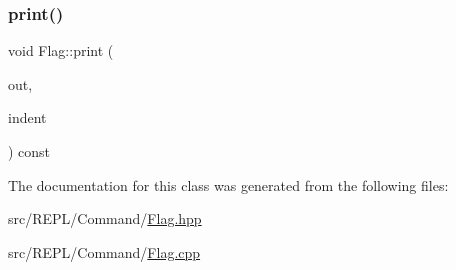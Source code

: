 \mbox{\label{classxd_1_1repl_1_1cmd_1_1_flag_a4ae9f01469a079faa39701b5be927353}} 
\subsubsection{\texorpdfstring{print()}{print()}}
{\footnotesize\ttfamily void Flag\+::print (\begin{DoxyParamCaption}\item[{std\+::ostream \&}]{out,  }\item[{\mbox{\hyperlink{classxd_1_1util_1_1_indent_helper}{xd\+::util\+::\+Indent\+Helper}} \&}]{indent }\end{DoxyParamCaption}) const}



The documentation for this class was generated from the following files\+:\begin{DoxyCompactItemize}
\item 
src/\+R\+E\+P\+L/\+Command/\mbox{\hyperlink{_flag_8hpp}{Flag.\+hpp}}\item 
src/\+R\+E\+P\+L/\+Command/\mbox{\hyperlink{_flag_8cpp}{Flag.\+cpp}}\end{DoxyCompactItemize}
